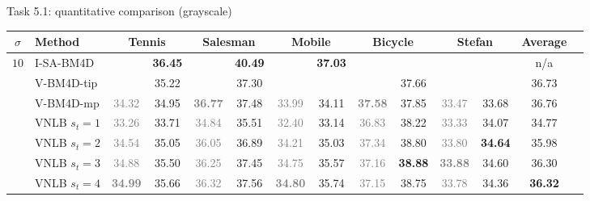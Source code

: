 \documentclass[mathserif, 8pt]{beamer}
\newcommand{\best}[1]{#1}
\newcommand{\bsic}[1]{\textcolor{gray}{#1}}
\newcommand{\Bsic}[1]{\textcolor{gray}{\textbf{#1}}}
\newcommand{\Best}[1]{\textbf{\textcolor{MyOrangeBrighter}{#1}}}
\begin{document}
\begin{frame}{Task 5.1: quantitative comparison (grayscale)}
	\vspace{-.3cm}
	\begin{center}
		{\small
		\renewcommand{\tabcolsep}{0.8mm}
		\renewcommand{\arraystretch}{1.0}
		\begin{tabular}{ c | l |c c | c c | c c | c c | c c | c c}
			\hline
			\rule{0pt}{6pt}$\sigma$ & Method             & \multicolumn{2}{c}{Tennis}  & \multicolumn{2}{c}{Salesman} & \multicolumn{2}{c}{Mobile}  & \multicolumn{2}{c}{Bicycle}  & \multicolumn{2}{c|}{Stefan} & Average \\\hline
			\multirow{1}{*}{$10$}
			                      & I-SA-BM4D            & \bsic{     } & \Best{36.45} & \bsic{     } & \Best{40.49}  & \bsic{     } & \Best{37.03} &              &               &              &              &  n/a  \\
			                      & V-BM4D-tip           & \bsic{     } &       35.22  & \bsic{     } &       37.30   &              &              &              &       37.66   &              &              &  36.73  \\
			                      & V-BM4D-mp            & \bsic{34.32} &       34.95  & \Bsic{36.77} &       37.48   & \bsic{33.99} &       34.11  & \Bsic{37.58} &       37.85   & \bsic{33.47} &       33.68  &  36.76  \\
			                      & VNLB   $s_t = 1$     & \bsic{33.26} &       33.71  & \bsic{34.84} &       35.51   & \bsic{32.40} &       33.14  & \bsic{36.83} &       38.22   & \bsic{33.33} &       34.07  &       34.77  \\
			                      & VNLB   $s_t = 2$     & \bsic{34.54} &       35.05  & \bsic{36.05} &       36.89   & \bsic{34.21} &       35.03  & \bsic{37.34} & \best{38.80}  & \bsic{33.80} & \Best{34.64} &       35.98  \\
			                      & VNLB   $s_t = 3$     & \bsic{34.88} &       35.50  & \bsic{36.25} &       37.45   & \bsic{34.75} &       35.57  & \bsic{37.16} & \Best{38.88}  & \Bsic{33.88} & \best{34.60} & \best{36.30} \\
			                      & VNLB   $s_t = 4$     & \Bsic{34.99} &       35.66  & \bsic{36.32} &       37.56   & \Bsic{34.80} &       35.74  & \bsic{37.15} &      {38.75}  & \bsic{33.78} &       34.36  & \Best{36.32} \\\hline

\end{tabular}}
\end{center}
\end{frame}
\end{document}

